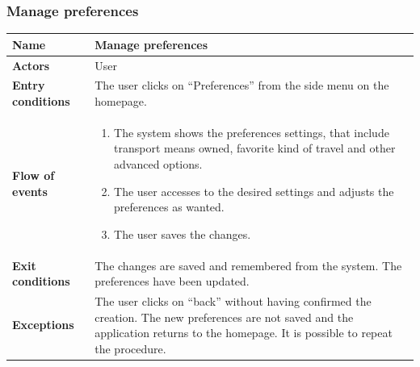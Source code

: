 \subsubsection{Manage preferences}
\begin{table}[!h]
	\centering
	{\renewcommand{\arraystretch}{2}%
		\begin{tabular}{|l|p{12cm}|}
			\hline
			\textbf{Name} 				& \textbf{Manage preferences} \\ \hline
			\textbf{Actors} 			& User \\ \hline
			\textbf{Entry conditions} 	& The user clicks on “Preferences” from the side menu on the homepage. \\ \hline
			\textbf{Flow of events}		& \begin{minipage}[t]{0.75\textwidth}
				\begin{enumerate}
					\item The system shows the preferences settings, that include transport means owned, favorite kind of travel and other advanced options.
					\item The user accesses to the desired settings and adjusts the preferences as wanted.
					\item The user saves the changes.
				\end{enumerate}
			\end{minipage}	\\ \hline
			\textbf{Exit conditions}	& The changes are saved and remembered from the system. The preferences have been updated.  \\ \hline
			\textbf{Exceptions}			& The user clicks on “back” without having confirmed the creation. The new preferences are not saved and the application returns to the homepage. It is possible to repeat the procedure. \\ \hline
	\end{tabular}}
\end{table}
\clearpage


